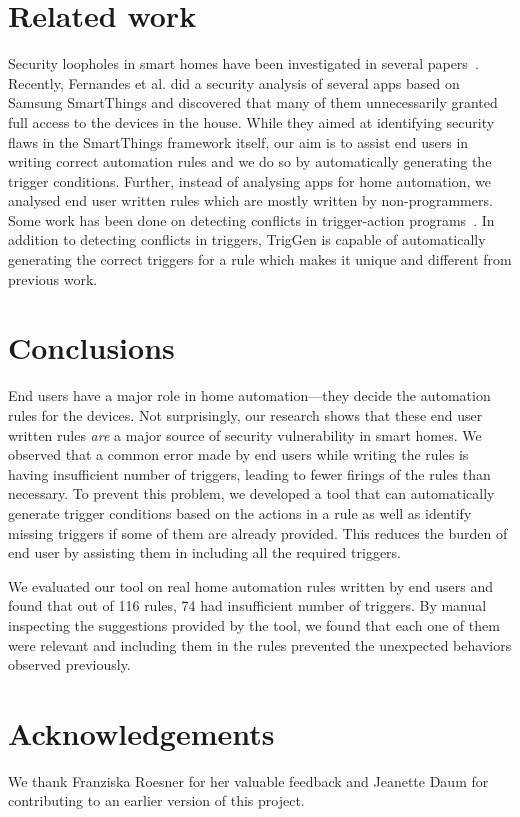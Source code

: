 \documentclass{sig-alternate-05-2015}
\begin{document}
\section{Related work}
Security loopholes in smart homes have been investigated in several papers~\cite{yoshi, dhanjani, jung, todayToTomorrow}. Recently, Fernandes et al.\cite{smartthings16} did a  security analysis of several apps based on Samsung SmartThings and discovered that many of them unnecessarily granted full access to the devices in the house. While they aimed at identifying security flaws in the SmartThings framework itself, our aim is to assist end users in writing correct automation rules and we do so by automatically generating the trigger conditions.  Further, instead of analysing apps for home automation, we analysed end user written rules which are mostly written by non-programmers. Some work has been done on detecting conflicts in trigger-action programs~\cite{rvs, homer, utea}. In addition to detecting conflicts in triggers, TrigGen is capable of automatically generating the correct triggers for a rule which makes it unique and different from previous work.

\section{Conclusions}
End users have a major role in home automation---they decide the automation rules for the devices. Not surprisingly, our research shows that these end user written rules \textit{are} a major source of security vulnerability in smart homes.
We observed that a common error made by end users while writing the rules is having insufficient number of triggers, leading to fewer firings of the rules than necessary. To prevent this problem, we developed a tool that can automatically generate trigger conditions based on the actions in a rule as well as identify missing triggers if some of them are already provided. This reduces the burden of end user by assisting them in including all the required triggers. 

We evaluated our tool on real home automation rules written by end users and found that out of 116 rules, 74 had insufficient number of triggers. By manual inspecting the suggestions provided by the tool, we found that each one of them were relevant and including them in the rules prevented the unexpected behaviors observed previously. 


\section{Acknowledgements}
We thank Franziska Roesner for her valuable feedback and Jeanette Daum for contributing to an earlier version of this project.

  
\end{document}
